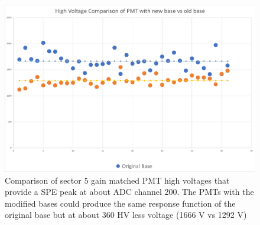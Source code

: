 \begin{figure}
	\centering
	\includegraphics[width=0.95\columnwidth,keepaspectratio]{img/pmtHVImprovement.png}
	\caption{Comparison of sector 5 gain matched PMT high voltages that provide a SPE peak at about ADC channel 200.
            The PMTs with the modified bases could produce the same response function of the original base but at about 360 HV less voltage (1666 V vs 1292 V)}
	\label{fig:pmtHVImprovement}
\end{figure}
